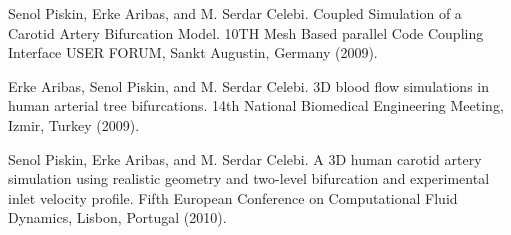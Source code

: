 
\begin{thebibliography}{10}

{\sc Senol Piskin, Erke Aribas, and M. Serdar Celebi}. {Coupled Simulation of a 
Carotid Artery Bifurcation Model}. 10TH Mesh Based parallel Code Coupling 
Interface USER FORUM, Sankt Augustin, Germany (2009).

{\sc Erke Aribas, Senol Piskin, and M. Serdar Celebi}. {3D blood flow 
simulations in human arterial tree bifurcations}. 14th National Biomedical 
Engineering Meeting, Izmir, Turkey (2009).

{\sc Senol Piskin, Erke Aribas, and M. Serdar Celebi}. {A 3D human carotid 
artery simulation using realistic geometry and two-level bifurcation and 
experimental inlet velocity profile}. Fifth European Conference on 
Computational Fluid Dynamics, Lisbon, Portugal (2010).

\end{thebibliography}